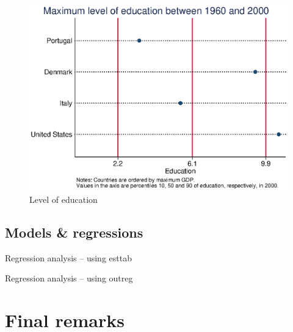 \documentclass[12pt]{article}
\begin{document}
\begin{figure}[ht]
	\begin{center}
		\includegraphics[scale = 0.8,trim = 0.0 0.0 0.0 0.0,clip]{example1.eps}
		\caption{Level of education}\label{fig:education}
	\end{center}
\end{figure}

\lipsum

\subsection{Models \& regressions}

\lipsum

\begin{table}[ht]
\caption{Regression analysis -- using esttab}\label{tb:regresultsb}
	\begin{center}
		
	\end{center}
\end{table}

\begin{table}[ht]
\caption{Regression analysis -- using outreg}\label{tb:regresults}
	\begin{center}
		
	\end{center}
\end{table}

\section{Final remarks}

\lipsum



\end{document}
